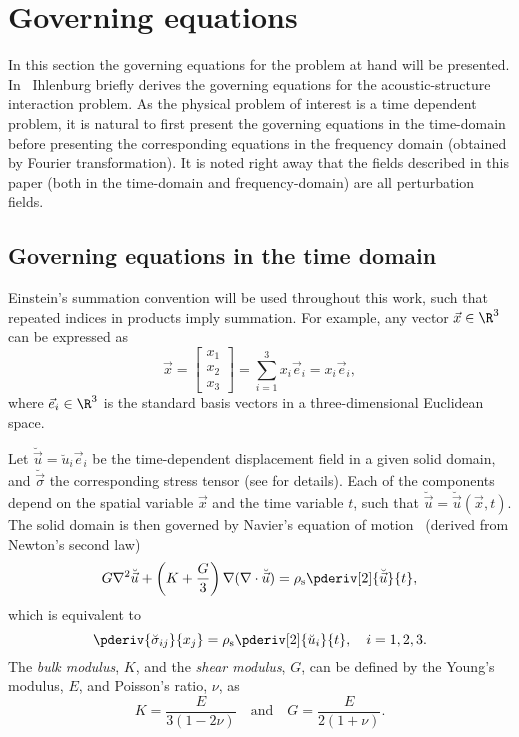 \section{Governing equations}
\label{Sec1:govEquations}
In this section the governing equations for the problem at hand will be presented. In~\cite[pp. 13-14]{Ihlenburg1998fea} Ihlenburg briefly derives the governing equations for the acoustic-structure interaction problem. As the physical problem of interest is a time dependent problem, it is natural to first present the governing equations in the time-domain before presenting the corresponding equations in the frequency domain (obtained by Fourier transformation). It is noted right away that the fields described in this paper (both in the time-domain and frequency-domain) are all perturbation fields.

\subsection{Governing equations in the time domain}
Einstein's summation convention will be used throughout this work, such that repeated indices in products imply summation. For example, any vector $\vec{x}\in\R^3$ can be expressed as
\begin{equation}
	\vec{x}=\begin{bmatrix}
	x_1\\
	x_2\\
	x_3
\end{bmatrix} = \sum_{i=1}^3 x_i\vec{e}_i = x_i\vec{e}_i,
\end{equation}
where $\vec{e}_i\in\R^3$ is the standard basis vectors in a three-dimensional Euclidean space.

Let $\breve{\vec{u}} = \breve{u}_i\vec{e}_i$ be the time-dependent displacement field in a given solid domain, and $\breve{\vec{\sigma}}$ the corresponding stress tensor (see  for details). Each of the components depend on the spatial variable $\vec{x}$ and the time variable $t$, such that $\breve{\vec{u}} = \breve{\vec{u}}(\vec{x},t)$. The solid domain is then governed by Navier's equation of motion~\cite{Fender1972sfa} (derived from Newton's second law) 
\begin{equation}\label{Eq1:navierTime}
	G\nabla^2\breve{\vec{u}}+\left(K+\frac{G}{3}\right)\nabla(\nabla \cdot\breve{\vec{u}}) = \rho_{\mathrm{s}}\pderiv[2]{\breve{\vec{u}}}{t},
\end{equation}
which is equivalent to~\cite[p. 223]{Slaughter2002tlt}
\begin{equation}
	\pderiv{\breve{\sigma}_{ij}}{x_j} = \rho_{\mathrm{s}}\pderiv[2]{\breve{u}_i}{t},\quad i=1,2,3.
\end{equation}
The \textit{bulk modulus}, $K$, and the \textit{shear modulus}, $G$, can be defined by the Young's modulus, $E$, and Poisson's ratio, $\nu$, as
\begin{equation}
	K = \frac{E}{3(1-2\nu)}\quad\text{and}\quad G = \frac{E}{2(1+\nu)}.
\end{equation}

